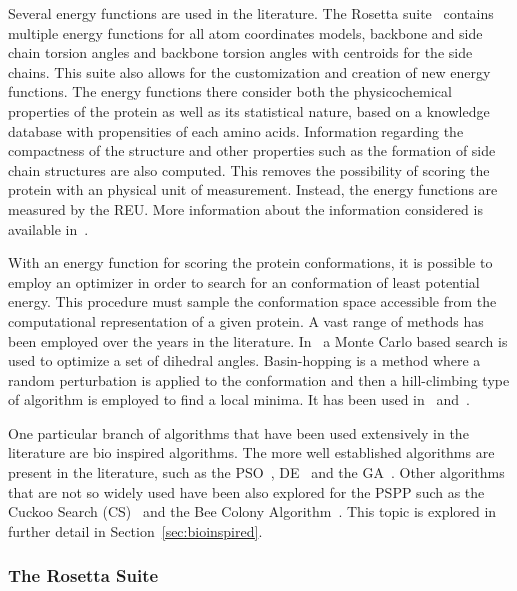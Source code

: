 Several energy functions are used in the literature. The Rosetta
suite~\cite{rohl2004protein,kaufmann2010practically} contains multiple energy
functions for all atom coordinates models, backbone and side chain torsion
angles and backbone torsion angles with centroids for the side chains. This
suite also allows for the customization and creation of new energy functions.
The energy functions there consider both the physicochemical properties of the
protein as well as its statistical nature, based on a knowledge database with
propensities of each amino acids. Information regarding the compactness of the
structure and other properties such as the formation of side chain structures
are also computed. This removes the possibility of scoring the protein with an
physical unit of measurement. Instead, the energy functions are measured by the
\ac{REU}. More information about the information considered is available
in~\cite{alford2017rosetta}.

With an energy function for scoring the protein conformations, it is possible
to employ an optimizer in order to search for an conformation of least
potential energy. This procedure must sample the conformation space accessible
from the computational representation of a given protein. A vast range of
methods has been employed over the years in the literature.
In~\cite{li1987monte} a Monte Carlo based search is used to optimize a set of
dihedral angles. Basin-hopping is a method where a random perturbation is
applied to the conformation and then a hill-climbing type of algorithm is
employed to find a local minima. It has been used in~\cite{prentiss2008protein}
and~\cite{olson2012efficient}.

One particular branch of algorithms that have been used extensively in the
literature are bio inspired algorithms. The more well established algorithms
are present in the literature, such as the \ac{PSO}~\cite{geng2017protein},
\ac{DE}~\cite{hao2017conformational} and the \ac{GA}~\cite{higgs2010genetic}.
Other algorithms that are not so widely used have been also explored for the
\ac{PSPP} such as the Cuckoo Search (CS)~\cite{ramyachitra2017modcsa} and the
Bee Colony Algorithm~\cite{li2015balance}. This topic is explored in further
detail in Section~\ref{sec:bioinspired}.

\subsubsection{The Rosetta Suite} \label{sec:rosetta}

